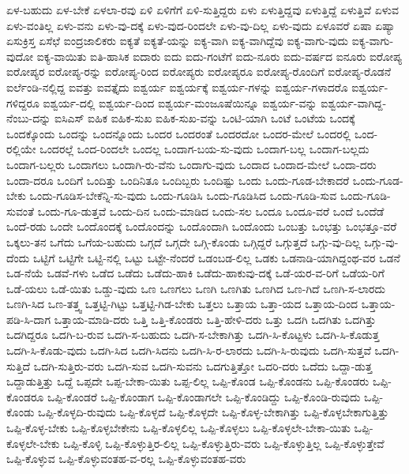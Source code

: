 {ಏಳ-ಬಹುದು
ಏಳ-ಬೇಕೆ
ಏಳಲಾ-ರವು
ಏಳಿ
ಏಳಿಗೆಗೆ
ಏಳಿ-ಸುತ್ತಿದ್ದರು
ಏಳು
ಏಳುತ್ತಿದ್ದವು
ಏಳುತ್ತಿದ್ದೆ
ಏಳುತ್ತಿವೆ
ಏಳುವ
ಏಳು-ವಂತಿಲ್ಲ
ಏಳು-ವನು
ಏಳು-ವು-ದಕ್ಕೆ
ಏಳು-ವುದ-ರಿಂದಲೇ
ಏಳು-ವು-ದಿಲ್ಲ
ಏಳು-ವುದು
ಏಳೂವರೆ
ಏಷಾ
ಏಷ್ಯಾ
ಏಸುಕ್ರಿಸ್ತ
ಏಸೆಛೆ
ಐಂದ್ರಜಾಲಿಕರು
ಐಕ್ಯತೆ
ಐಕ್ಯತೆ-ಯನ್ನು
ಐಕ್ಯ-ವಾಗಿ
ಐಕ್ಯ-ವಾಗಿದ್ದೆವು
ಐಕ್ಯ-ವಾಗು-ವುದು
ಐಕ್ಯ-ವಾಗು-ವುದೋ
ಐಕ್ಯ-ವಾಯಿತು
ಐತಿ-ಹಾಸಿಕ
ಐದಾರು
ಐದು
ಐದು-ಗಂಟೆಗೆ
ಐದು-ನೂರು
ಐದು-ವರ್ಷದ
ಐನೂರು
ಐರೋಪ್ಯ
ಐರೋಪ್ಯರ
ಐರೋಪ್ಯ-ರನ್ನು
ಐರೋಪ್ಯ-ರಿಂದ
ಐರೋಪ್ಯರು
ಐರೋಪ್ಯರೂ
ಐರೋಪ್ಯ-ರೊಂದಿಗೆ
ಐರೋಪ್ಯ-ರೊಡನೆ
ಐರ್ಲೆಂಡಿ-ನಲ್ಲಿದ್ದ
ಐವತ್ತು
ಐವತ್ತೈದು
ಐಶ್ವರ್ಯ
ಐಶ್ವರ್ಯಕ್ಕೆ
ಐಶ್ವರ್ಯ-ಗಳನ್ನು
ಐಶ್ವರ್ಯ-ಗಳಾದರೊ
ಐಶ್ವರ್ಯ-ಗಳಿದ್ದರೂ
ಐಶ್ವರ್ಯ-ದಲ್ಲಿ
ಐಶ್ವರ್ಯ-ದಿಂದ
ಐಶ್ವರ್ಯ-ಮಂಜೂಷೆಯಿನ್ನೂ
ಐಶ್ವರ್ಯ-ವನ್ನು
ಐಶ್ವರ್ಯ-ವಾಗಿದ್ದ-ನೆಂಬು-ದನ್ನು
ಐಸಿಎಸ್
ಐಹಿಕ
ಐಹಿಕ-ಸುಖ
ಐಹಿಕ-ಸುಖ-ವನ್ನು
ಒಂಟಿ-ಯಾಗಿ
ಒಂಟೆ
ಒಂಟೆಯ
ಒಂದಕ್ಕೆ
ಒಂದಕ್ಕೊಂದು
ಒಂದನ್ನು
ಒಂದನ್ನೊಂದು
ಒಂದರ
ಒಂದರಂತೆ
ಒಂದರದೋ
ಒಂದರ-ಮೇಲೆ
ಒಂದರಲ್ಲಿ
ಒಂದ-ರಲ್ಲಿಯೇ
ಒಂದರಲ್ಲೆ
ಒಂದ-ರಿಂದಲೇ
ಒಂದಲ್ಲ
ಒಂದಾಗ-ಬಯ-ಸು-ವುದು
ಒಂದಾಗ-ಬಲ್ಲ
ಒಂದಾಗ-ಬಲ್ಲದು
ಒಂದಾಗ-ಬಲ್ಲರು
ಒಂದಾಗಲು
ಒಂದಾಗಿ-ರು-ವೆನು
ಒಂದಾಗು-ವುದು
ಒಂದಾದ
ಒಂದಾದ-ಮೇಲೆ
ಒಂದಾ-ದರು
ಒಂದಾ-ದರೂ
ಒಂದಿಗೆ
ಒಂದಿತ್ತು
ಒಂದಿನಿತೂ
ಒಂದಿಬ್ಬರು
ಒಂದಿಷ್ಟು
ಒಂದು
ಒಂದು-ಗೂಡ-ಬೇಕಾದರೆ
ಒಂದು-ಗೂಡ-ಬೇಕು
ಒಂದು-ಗೂಡಿಸ-ಬೇಕೆನ್ನಿ-ಸು-ವುದು
ಒಂದು-ಗೂಡಿಸಿ
ಒಂದು-ಗೂಡಿಸಿದ
ಒಂದು-ಗೂಡಿ-ಸುವ
ಒಂದು-ಗೂಡಿ-ಸುವಂತೆ
ಒಂದು-ಗೂ-ಡುತ್ತವೆ
ಒಂದು-ದಿನ
ಒಂದು-ಮಾಡಿದ
ಒಂದು-ಸಲ
ಒಂದೂ
ಒಂದೂ-ವರೆ
ಒಂದೆ
ಒಂದೆಡೆ
ಒಂದೆ-ರಡು
ಒಂದೇ
ಒಂದೊಂದಕ್ಕೆ
ಒಂದೊಂದನ್ನು
ಒಂದೊಂದಾಗಿ
ಒಂದೊಂದು
ಒಂಬತ್ತು
ಒಂಭತ್ತು
ಒಂಭತ್ತೂ-ವರೆ
ಒಕ್ಕಲು-ತನ
ಒಗೆದು
ಒಗೆಯ-ಬಹುದು
ಒಗ್ಗದೆ
ಒಗ್ಗದೇ
ಒಗ್ಗಿ-ಕೊಂಡು
ಒಗ್ಗಿದ್ದರೆ
ಒಗ್ಗುತ್ತದೆ
ಒಗ್ಗು-ವು-ದಿಲ್ಲ
ಒಗ್ಗು-ವು-ದೆಂದು
ಒಟ್ಟಿಗೆ
ಒಟ್ಟಿಗೇ
ಒಟ್ಟಿ-ನಲ್ಲಿ
ಒಟ್ಟು
ಒಟ್ಟೇ-ನೆಂದರೆ
ಒಡಂಬಡ-ಲಿಲ್ಲ
ಒಡಕು
ಒಡನಾಡಿ-ಯಾಗಿದ್ದಂಥ-ವರ
ಒಡನೆ
ಒಡ-ನೆಯೆ
ಒಡವೆ-ಗಳು
ಒಡೆದ
ಒಡೆದು
ಒಡೆದು-ಹಾಕಿ
ಒಡೆದು-ಹಾಕುವು-ದಕ್ಕೆ
ಒಡೆ-ಯರ-ವ-ರಿಗೆ
ಒಡೆಯ-ರಿಗೆ
ಒಡೆ-ಯಲು
ಒಡೆ-ಯಿತು
ಒಡ್ಡು-ವುದು
ಒಣ
ಒಣಗಲು
ಒಣಗಿ
ಒಣಗಿತು
ಒಣಗಿದ
ಒಣ-ಗಿದೆ
ಒಣಗಿ-ಸ-ಲಾರದು
ಒಣಗಿ-ಸಿದ
ಒಣ-ತತ್ತ್ವ
ಒತ್ತಟ್ಟಿ-ಗಿಟ್ಟು
ಒತ್ತಟ್ಟಿ-ಗಿಡ-ಬೇಕು
ಒತ್ತಲು
ಒತ್ತಾಯ
ಒತ್ತಾ-ಯದ
ಒತ್ತಾಯ-ದಿಂದ
ಒತ್ತಾಯ-ಪಡಿ-ಸಿ-ದಾಗ
ಒತ್ತಾಯ-ಮಾಡಿ-ದರು
ಒತ್ತಿ
ಒತ್ತಿ-ಕೊಂಡರು
ಒತ್ತಿ-ಹೇಳಿ-ದರು
ಒತ್ತು
ಒದಗಿ
ಒದಗಿತು
ಒದಗಿತ್ತು
ಒದಗಿದ್ದರೂ
ಒದಗಿ-ಬ-ರುವ
ಒದಗಿ-ಸ-ಬಹುದು
ಒದಗಿ-ಸ-ಬೇಕಾಗಿತ್ತು
ಒದಗಿ-ಸಿ-ಕೊಟ್ಟಳು
ಒದಗಿ-ಸಿ-ಕೊಡುತ್ತ
ಒದಗಿ-ಸಿ-ಕೊಡು-ವುದು
ಒದಗಿ-ಸಿದ
ಒದಗಿ-ಸಿದನು
ಒದಗಿ-ಸಿ-ರ-ಲಾರದು
ಒದಗಿ-ಸಿ-ರುವುದು
ಒದಗಿ-ಸುತ್ತವೆ
ಒದಗಿ-ಸುತ್ತಿದೆ
ಒದಗಿ-ಸುತ್ತಿರು-ವರು
ಒದಗಿ-ಸುವ
ಒದಗಿ-ಸುವನು
ಒದಗುತ್ತಿತ್ತೋ
ಒದರಿ-ದರು
ಒದೆದು
ಒದ್ದಾ-ಡುತ್ತ
ಒದ್ದಾಡುತ್ತಿತ್ತು
ಒದ್ದೆ
ಒಪ್ಪದೇ
ಒಪ್ಪ-ಬೇಕಾ-ಯಿತು
ಒಪ್ಪ-ಲಿಲ್ಲ
ಒಪ್ಪಿ-ಕೊಂಡ
ಒಪ್ಪಿ-ಕೊಂಡನು
ಒಪ್ಪಿ-ಕೊಂಡರು
ಒಪ್ಪಿ-ಕೊಂಡರೂ
ಒಪ್ಪಿ-ಕೊಂಡರೆ
ಒಪ್ಪಿ-ಕೊಂಡಾಗ
ಒಪ್ಪಿ-ಕೊಂಡಾಗಲೇ
ಒಪ್ಪಿ-ಕೊಂಡಿದ್ದು
ಒಪ್ಪಿ-ಕೊಂಡಿ-ರುವುದು
ಒಪ್ಪಿ-ಕೊಂಡು
ಒಪ್ಪಿ-ಕೊಳ್ಳದಿ-ರುವುದು
ಒಪ್ಪಿ-ಕೊಳ್ಳದೆ
ಒಪ್ಪಿ-ಕೊಳ್ಳದೇ
ಒಪ್ಪಿ-ಕೊಳ್ಳ-ಬೇಕಾಗಿತ್ತು
ಒಪ್ಪಿ-ಕೊಳ್ಳಬೇಕಾಗುತ್ತಿತ್ತು
ಒಪ್ಪಿ-ಕೊಳ್ಳ-ಬೇಕು
ಒಪ್ಪಿ-ಕೊಳ್ಳಬೇಕೇನು
ಒಪ್ಪಿ-ಕೊಳ್ಳಲಿಲ್ಲ
ಒಪ್ಪಿ-ಕೊಳ್ಳಲು
ಒಪ್ಪಿ-ಕೊಳ್ಳಲೇ-ಬೇಕಾ-ಯಿತು
ಒಪ್ಪಿ-ಕೊಳ್ಳಲೇ-ಬೇಕು
ಒಪ್ಪಿ-ಕೊಳ್ಳಿ
ಒಪ್ಪಿ-ಕೊಳ್ಳುತ್ತಿರ-ಲಿಲ್ಲ
ಒಪ್ಪಿ-ಕೊಳ್ಳುತ್ತಿರು-ವರು
ಒಪ್ಪಿ-ಕೊಳ್ಳುತ್ತಿಲ್ಲ
ಒಪ್ಪಿ-ಕೊಳ್ಳುತ್ತೇವೆ
ಒಪ್ಪಿ-ಕೊಳ್ಳುವ
ಒಪ್ಪಿ-ಕೊಳ್ಳುವಂತಹ-ವ-ರಲ್ಲ
ಒಪ್ಪಿ-ಕೊಳ್ಳುವಂತಹ-ವರು
}
